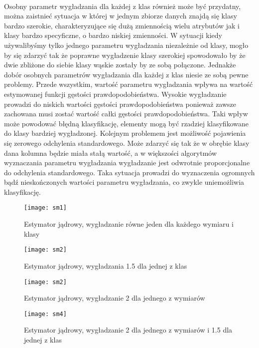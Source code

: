 \documentclass[a4paper,12pt,twoside]{article}
\begin{document}
\paragraph{}
Osobny parametr wygładzania dla każdej z klas również może być przydatny, można zaistnieć sytuacja w której w jednym zbiorze danych znajdą się klasy bardzo szerokie, charakteryzujące się dużą zmiennością wielu atrybutów jak i klasy bardzo specyficzne, o bardzo niskiej zmienności. W sytuacji kiedy używalibyśmy tylko jednego parametru wygładzania niezależnie od klasy, mogło by się zdarzyć tak że poprawne wygładzenie klasy szerokiej spowodowało by że dwie zbliżone do siebie klasy wąskie zostały by ze sobą połączone. Jednakże dobór osobnych parametrów wygładzania dla każdej z klas niesie ze sobą pewne problemy. Przede wszystkim, wartość parametru wygładzania wpływa na wartość estymowanej funkcji gęstości prawdopodobieństwa. Wysokie wygładzanie prowadzi do niskich wartości gęstości prawdopodobieństwa ponieważ zawsze zachowana musi zostać wartość całki gęstości prawdopodobieństwa. Taki wpływ może powodować błędną klasyfikację, elementy mogą być rzadziej klasyfikowane do klasy bardziej wygładzonej. Kolejnym problemem jest możliwość pojawienia się zerowego odchylenia standardowego. Może zdarzyć się tak że w obrębie klasy dana kolumna będzie miała stałą wartość, a w większości algorytmów wyznaczania parametru wygładzania wygładzanie jest odwrotnie proporcjonalne do odchylenia standardowego. Taka sytuacja prowadzi do wyznaczenia ogromnych bądź nieskończonych wartości parametru wygładzania, co zwykle uniemożliwia klasyfikację.
\newpage
\vfill 
\begin{figure}
    \centering
    \texttt{[image: sm1]}
    \caption{Estymator jądrowy, wygładzanie równe jeden dla każdego wymiaru i klasy}
\end{figure}
\begin{figure}
    \centering
    \texttt{[image: sm2]}
    \caption{Estymator jądrowy, wygładzania 1.5 dla jednej z klas}
\end{figure}
\vfill
\clearpage
\newpage
\vfill 
\begin{figure}
    \centering
    \texttt{[image: sm2]}
    \caption{Estymator jądrowy, wygładzanie 2 dla jednego z wymiarów}
\end{figure}
\begin{figure}
    \centering
    \texttt{[image: sm4]}
    \caption{Estymator jądrowy, wygładzanie 2 dla jednego z wymiarów i 1.5 dla jednej z klas}
\end{figure}
\vfill
\clearpage
\newpage
\end{document}
